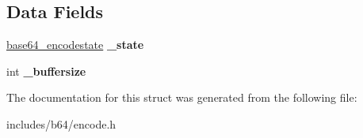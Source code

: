 \subsection*{Data Fields}
\begin{DoxyCompactItemize}
\item 
\hypertarget{structbase64_1_1encoder_a229a86fbbf4f36949427ef5c29a77e5e}{\hyperlink{structbase64_1_1base64__encodestate}{base64\-\_\-encodestate} {\bfseries \-\_\-state}}\label{structbase64_1_1encoder_a229a86fbbf4f36949427ef5c29a77e5e}

\item 
\hypertarget{structbase64_1_1encoder_ab9ef2d501bcca4a9f9e076df6044201c}{int {\bfseries \-\_\-buffersize}}\label{structbase64_1_1encoder_ab9ef2d501bcca4a9f9e076df6044201c}

\end{DoxyCompactItemize}


The documentation for this struct was generated from the following file\-:\begin{DoxyCompactItemize}
\item 
includes/b64/encode.\-h\end{DoxyCompactItemize}
